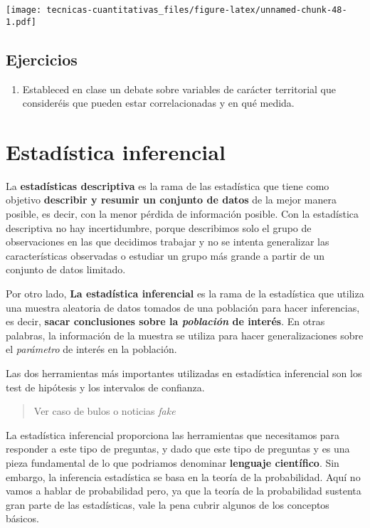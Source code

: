 \documentclass[
]{book}
\providecommand{\tightlist}{%
  \setlength{\itemsep}{0pt}\setlength{\parskip}{0pt}}
\begin{document}
\texttt{[image: tecnicas-cuantitativas\_files/figure-latex/unnamed-chunk-48-1.pdf]}

\hypertarget{ejercicios-1}{%
\section{Ejercicios}\label{ejercicios-1}}

\begin{enumerate}
\def\labelenumi{\arabic{enumi}.}
\tightlist
\item
  Estableced en clase un debate sobre variables de carácter territorial que consideréis que pueden estar correlacionadas y en qué medida.
\end{enumerate}

\hypertarget{estaduxedstica-inferencial}{%
\chapter{Estadística inferencial}\label{estaduxedstica-inferencial}}

La \textbf{estadísticas descriptiva} es la rama de las estadística que tiene como objetivo \textbf{describir y resumir un conjunto de datos} de la mejor manera posible, es decir, con la menor pérdida de información posible. Con la estadística descriptiva no hay incertidumbre, porque describimos solo el grupo de observaciones en las que decidimos trabajar y no se intenta generalizar las características observadas o estudiar un grupo más grande a partir de un conjunto de datos limitado.

Por otro lado, \textbf{La estadística inferencial} es la rama de la estadística que utiliza una muestra aleatoria de datos tomados de una población para hacer inferencias, es decir, \textbf{sacar conclusiones sobre la \emph{población} de interés}. En otras palabras, la información de la muestra se utiliza para hacer generalizaciones sobre el \emph{parámetro} de interés en la población.

Las dos herramientas más importantes utilizadas en estadística inferencial son los test de hipótesis y los intervalos de confianza.

\begin{quote}
Ver caso de bulos o noticias \emph{fake}
\end{quote}

La estadística inferencial proporciona las herramientas que necesitamos para responder a este tipo de preguntas, y dado que este tipo de preguntas y es una pieza fundamental de lo que podriamos denominar \textbf{lenguaje científico}. Sin embargo, la inferencia estadística se basa en la teoría de la probabilidad. Aquí no vamos a hablar de probabilidad pero, ya que la teoría de la probabilidad sustenta gran parte de las estadísticas, vale la pena cubrir algunos de los conceptos básicos.
\end{document}
